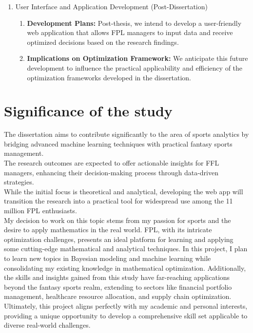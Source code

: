 \documentclass[12pt,oneside,a4paper]{book}
\theoremstyle{definition}
\theoremstyle{remark}
\begin{document}
\begin{enumerate}
				\item[(v)] User Interface and Application Development (Post-Dissertation)
				\begin{enumerate}
					\item \textbf{Development Plans:} Post-thesis, we intend to develop a user-friendly web application that allows FPL managers to input data and receive optimized decisions based on the research findings.

					\item \textbf{Implications on Optimization Framework:} We anticipate this future development to influence the practical applicability and efficiency of the optimization frameworks developed in the dissertation.
				\end{enumerate}
			\end{enumerate}


		\section{Significance of the study}
			The dissertation aims to contribute significantly to the area of sports analytics by bridging advanced machine learning techniques with practical fantasy sports management.\\
			The research outcomes are expected to offer actionable insights for FFL managers, enhancing their decision-making process through data-driven strategies.\\
			While the initial focus is theoretical and analytical, developing the web app will transition the research into a practical tool for widespread use among the 11 million FPL enthusiasts. \\

			My decision to work on this topic stems from my passion for sports and the desire to apply mathematics in the real world. FPL, with its intricate optimization challenges, presents an ideal platform for learning and applying some cutting-edge mathematical and analytical techniques. In this project, I plan to learn new topics in Bayesian modeling and machine learning while consolidating my existing knowledge in mathematical optimization. Additionally, the skills and insights gained from this study have far-reaching applications beyond the fantasy sports realm, extending to sectors like financial portfolio management, healthcare resource allocation, and supply chain optimization. Ultimately, this project aligns perfectly with my academic and personal interests, providing a unique opportunity to develop a comprehensive skill set applicable to diverse real-world challenges.
\end{document}
